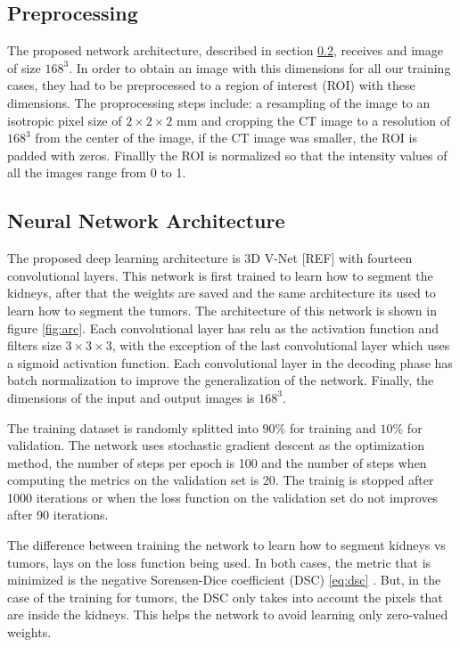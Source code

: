 \documentclass{article}
\begin{document}
\subsection{Preprocessing}
\label{sec:prepro}
The proposed network architecture, described in section \ref{sec:nnarc}, receives and image of size $168^3$. In order to
obtain an image with this dimensions for all our training cases, they had to be preprocessed to a region of interest (ROI) with
these dimensions.  The proprocessing steps include: a resampling of the image to an isotropic pixel size of $2 \times 2 \times 2$ mm and cropping the CT image to a resolution of $168^3$ from the center of the image, if the CT image was smaller, the ROI is padded
with zeros. Finallly the ROI is normalized so that the intensity values of all the images range from 0 to 1. 

\subsection{Neural Network Architecture}
\label{sec:nnarc}
The proposed deep learning architecture is 3D V-Net [REF] with fourteen convolutional layers. This network is
first trained to learn how to segment the kidneys, after that the weights are saved and 
the same architecture its used to learn how to segment the tumors. The architecture of this 
network is shown in figure \ref{fig:arc}.  Each convolutional layer has relu as the activation function and
filters size $3\times 3 \times 3$, with the exception of the last convolutional layer which 
uses a sigmoid activation function. Each convolutional layer in the decoding phase has batch normalization to improve the generalization of the network. Finally, the dimensions of the input and output images is $168^3$. 

The training dataset is randomly splitted into $90\%$ for training and $10\%$ for validation.  
The network uses stochastic gradient descent as the optimization method, the number of steps per epoch is
100 and the number of steps when computing the metrics on the validation set is 20. The trainig is
stopped after 1000 iterations or when the loss function on the validation set do not improves after
90 iterations. 

The difference between training the network to learn how to segment kidneys vs tumors, lays on the 
loss function being used. In both cases, the metric that is minimized is the negative Sorensen-Dice coefficient (DSC) \ref{eq:dsc}
\cite{dice1945measures}.  But, in the case of the training for tumors, the DSC only takes into account the pixels that are
inside the kidneys. This helps the network to avoid learning only zero-valued weights. 
\end{document}
